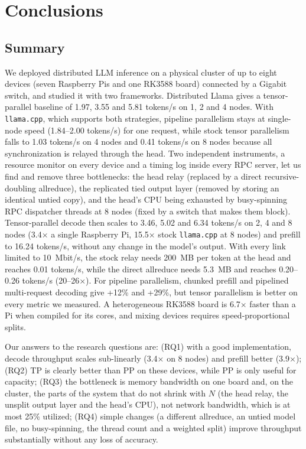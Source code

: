 \documentclass[11pt,a4paper]{article}
\begin{document}
\section{Conclusions}\label{sec:n9}

\subsection{Summary}\label{sec:n9_1}
We deployed distributed LLM inference on a physical cluster of up to eight devices (seven Raspberry Pis and one RK3588 board) connected by a Gigabit switch, and studied it with two frameworks. Distributed Llama gives a tensor-parallel baseline of 1.97, 3.55 and 5.81 tokens/s on 1, 2 and 4 nodes. With \texttt{llama.cpp}, which supports both strategies, pipeline parallelism stays at single-node speed (1.84--2.00 tokens/s) for one request, while stock tensor parallelism falls to 1.03 tokens/s on 4 nodes and 0.41 tokens/s on 8 nodes because all synchronization is relayed through the head. Two independent instruments, a resource monitor on every device and a timing log inside every RPC server, let us find and remove three bottlenecks: the head relay (replaced by a direct recursive-doubling allreduce), the replicated tied output layer (removed by storing an identical untied copy), and the head's CPU being exhausted by busy-spinning RPC dispatcher threads at 8 nodes (fixed by a switch that makes them block). Tensor-parallel decode then scales to 3.46, 5.02 and 6.34 tokens/s on 2, 4 and 8 nodes (3.4$\times$ a single Raspberry Pi, 15.5$\times$ stock \texttt{llama.cpp} at 8 nodes) and prefill to 16.24 tokens/s, without any change in the model's output. With every link limited to 10~Mbit/s, the stock relay needs 200~MB per token at the head and reaches 0.01 tokens/s, while the direct allreduce needs 5.3~MB and reaches 0.20--0.26 tokens/s (20--26$\times$). For pipeline parallelism, chunked prefill and pipelined multi-request decoding give +12\% and +29\%, but tensor parallelism is better on every metric we measured. A heterogeneous RK3588 board is 6.7$\times$ faster than a Pi when compiled for its cores, and mixing devices requires speed-proportional splits.

Our answers to the research questions are: (RQ1) with a good implementation, decode throughput scales sub-linearly (3.4$\times$ on 8 nodes) and prefill better (3.9$\times$); (RQ2) TP is clearly better than PP on these devices, while PP is only useful for capacity; (RQ3) the bottleneck is memory bandwidth on one board and, on the cluster, the parts of the system that do not shrink with $N$ (the head relay, the unsplit output layer and the head's CPU), not network bandwidth, which is at most 25\% utilized; (RQ4) simple changes (a different allreduce, an untied model file, no busy-spinning, the thread count and a weighted split) improve throughput substantially without any loss of accuracy.
\end{document}
